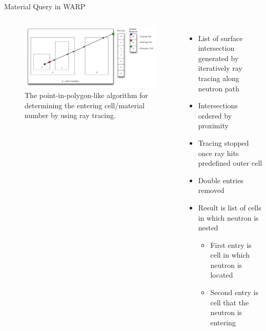 \documentclass[xcolor=x11names, compress, handout]{beamer}
\renewcommand{\(}{\begin{columns}}
\renewcommand{\)}{\end{columns}}
\newcommand{\<}[1]{\begin{column}{#1}}
\renewcommand{\>}{\end{column}}
\begin{document}
\begin{frame}{Material Query in WARP \cite{warp}}

\begin{columns}
	\begin{figure}[h!]
	\includegraphics[width=2.25 in]{../figs/whereami}
	\caption*{The point-in-polygon-like algorithm for determining the entering cell/material number by 
	using ray tracing. \label{whereami}}
	\end{figure}
	\begin{itemize}
	\pause
	\item{List of surface intersection generated by iteratively ray tracing along neutron path}
	\pause
	\item{Intersections ordered by proximity}
	\pause
	\item{Tracing stopped once ray hits predefined outer cell}
	\pause
	\item{Double entries removed}
	\pause
	\item{Result is list of cells in which neutron is nested}
		\begin{itemize}
		\pause
		\item{First entry is cell in which neutron is located}
		\pause
		\item{Second entry is cell that the neutron is entering}
		\end{itemize}
	\end{itemize}
\end{columns}
\end{frame}
\end{document}
